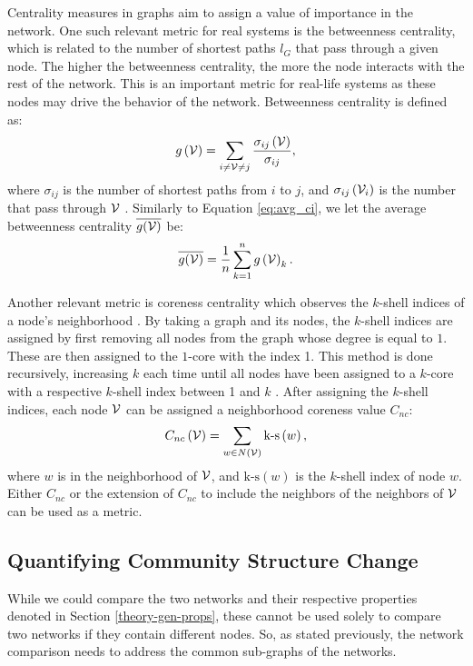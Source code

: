 Centrality measures in graphs aim to assign a value of importance in the network. One such relevant metric for real systems is the betweenness centrality, which is related to the number of shortest paths $l_G$ that pass through a given node. The higher the betweenness centrality, the more the node interacts with the rest of the network. This is an important metric for real-life systems as these nodes may drive the behavior of the network. Betweenness centrality is defined as:
\begin{equation}\label{eq:btween}
    g\left(\mathcal{V}\right) = \sum_{i\neq\mathcal{V} \neq j}\frac{\sigma_{ij}\left(\mathcal{V} \right)}{\sigma_{ij}},
\end{equation}
where $\sigma_{ij}$ is the number of shortest paths from $i$ to $j$, and $\sigma_{ij}\left( \mathcal{V}_i\right)$ is the number that pass through $\mathcal{V}$ \citep{Freeman1977}. Similarly to Equation \ref{eq:avg_ci}, we let the average betweenness centrality $\overline{g ( \mathcal{V} )}$ be:
\begin{equation}\label{eq:avg_btween}
    \overline{g ( \mathcal{V} )} = \frac{1}{n}\sum_{k=1}^n g\left(\mathcal{V}\right)_k.
\end{equation}

Another relevant metric is coreness centrality which observes the $k$-shell indices of a node's neighborhood \citep{Bae2014}. By taking a graph and its nodes, the $k$-shell indices are assigned by first removing all nodes from the graph whose degree is equal to $1$. These are then assigned to the $1$-core with the index 1. This method is done recursively, increasing $k$ each time until all nodes have been assigned to a $k$-core with a respective $k$-shell index between 1 and $k$ \citep{Bae2014,Lue2016,Dorogovtsev2006}. After assigning the $k$-shell indices, each node $\mathcal{V}$ can be assigned a neighborhood coreness value $C_{nc}$:
\begin{equation}\label{eq:n-coreness}
    C_{nc}\left( \mathcal{V} \right) = \sum_{w \in N\left(\mathcal{V}\right) } \text{k-s}\left(w\right),
\end{equation}
where $w$ is in the neighborhood of $\mathcal{V}$, and $\text{k-s}(w)$ is the $k$-shell index of node $w$. Either $C_{nc}$ or the extension of $C_{nc}$ to include the neighbors of the neighbors of $\mathcal{V}$ can be used as a metric.

\subsection{Quantifying Community Structure Change}\label{theory:struct-change}
While we could compare the two networks and their respective properties denoted in Section \ref{theory-gen-props}, these cannot be used solely to compare two networks if they contain different nodes. So, as stated previously, the network comparison needs to address the common sub-graphs of the networks.

